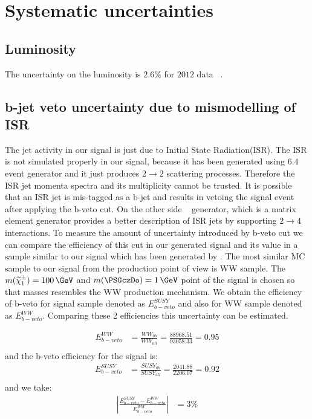 \section{Systematic uncertainties}
\label{sect:sys}
\subsection{Luminosity}
The uncertainty on the luminosity  is $2.6\%$ for $2012$ data ~\cite{LUMI}.

\subsection{b-jet veto uncertainty due to mismodelling of ISR}
The jet activity in our signal is just due to Initial State Radiation(ISR). The ISR is not simulated properly in our signal, because it has been generated using \PYTHIA $6.4$ event generator and it just produces $2 \rightarrow 2$ scattering processes. Therefore the ISR jet momenta spectra and its multiplicity cannot be trusted. It is possible that an ISR jet is mis-tagged as a b-jet and results in vetoing the signal event after applying the b-veto cut. On the other side \MADGRAPH ~\cite{MADGRAPH} generator, which is a matrix element generator provides a better description of ISR jets by supporting $2 \rightarrow 4$ interactions. To measure the amount of uncertainty introduced by b-veto cut we can compare the efficiency of this cut in our generated signal and its value in a sample similar to our signal which has been generated by \MADGRAPH. 
The most similar MC sample to our signal from the production point of view is WW sample. The $m(\chione) = 100\,\GeV$ and $m(\PSGczDo) = 1\,\GeV$ point of the signal is chosen so that masses resembles the WW production mechanism. %
We obtain the efficiency of b-veto for signal sample denoted as $E^{SUSY}_{b-veto}$ and also for WW sample denoted as $E^{WW}_{b-veto}$.
Comparing these 2 efficiencies this uncertainty can be estimated.


\begin{align}
E^{WW}_{b-veto} &= \frac{WW_{0b}}{WW_{all}} = \frac{88968.51}{93058.33} = 0.95\\ \nonumber
\end{align}
and the b-veto efficiency for the signal is:
\begin{align}
E^{SUSY}_{b-veto} &= \frac{SUSY_{0b}}{SUSY_{all}} = \frac{2041.88}{2206.07} = 0.92 \\ \nonumber
\end{align}
and we take:
\begin{align}
|\frac{E^{SUSY}_{b-veto}-E^{WW}_{b-veto}}{E^{WW}_{b-veto}}| &= 3 \% \\ \nonumber
\end{align}

